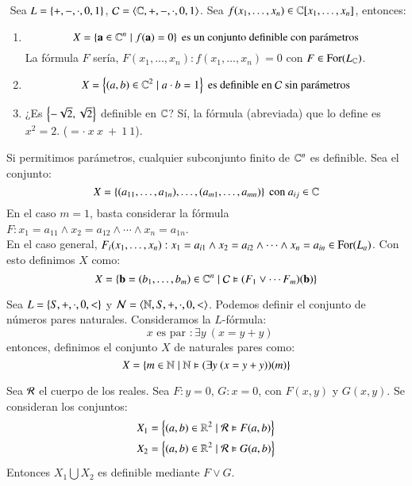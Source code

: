 \begin{eg}$ $
    Sea $L = \left\{+, -, \cdot, 0, 1\right\}$, $\mathcal{C} = \langle\mathbb{C}, +, -, \cdot, 0, 1\rangle$. Sea $f(x_1, \ldots, x_n) \in \mathbb{C}[x_1, \ldots, x_n]$, entonces:
    \begin{enumerate}
        \item
        $$
            X = \left\{\mathbf{a} \in \mathbb{C}^n \mid f(\mathbf{a}) = 0\right\} \text{ es un conjunto definible con parámetros}
        $$
        La fórmula $F$ sería, $F(x_1, \ldots, x_n): f(x_1, \ldots, x_n) = 0$ con $F \in \mathrm{For}(L_{\mathbb{C}})$.

        \item $$X = \left\{(a, b) \in \mathbb{C}^2 \mid a\cdot b = 1\right\} \text{ es definible en $\mathcal{C}$ sin parámetros}$$

        \item ¿Es $\left\{-\sqrt 2, \sqrt 2\right\}$ definible en $\mathcal{\mathbb{C}}$? Sí, la fórmula (abreviada) que lo define es $x^2 = 2$. ($ = \cdot\ x\ x\ +\ 1\ 1$).
    \end{enumerate}
\end{eg}

\begin{obs}
    Si permitimos parámetros, cualquier subconjunto finito de $\mathbb{C}^n$ es definible. Sea el conjunto:
    $$
        X = \left\{(a_{11}, \ldots, a_{1n}), \ldots, (a_{m1}, \ldots, a_{mn})\right\} \text{ con } a_{ij} \in \mathbb{C}
    $$
    En el caso $m = 1$, basta considerar la fórmula $F: x_1 = a_{11} \land x_2 = a_{12} \land \cdots \land x_n = a_{1n}$.\\
    En el caso general, $F_i(x_1, \ldots, x_n): x_1 = a_{i1} \land x_2 = a_{i2} \land \cdots \land x_n = a_{in} \in \mathrm{For}(L_a)$. Con esto definimos $X$ como:
    $$
        X = \left\{\mathbf{b} = (b_1, \ldots, b_m) \in \mathbb{C}^n \mid \mathcal{C} \vDash (F_1 \lor \cdots F_m)(\mathbf{b})\right\}
    $$
\end{obs}

\begin{eg}
    Sea $L = \left\{S, +, \cdot, 0, <\right\}$ y $\mathcal{N} = \langle\mathbb{N}, S, +, \cdot, 0, <\rangle$. Podemos definir el conjunto de números pares naturales. Consideramos la $L$-fórmula:
    $$
        \text{ $x$ es par }: \exists y\ (x = y + y)
    $$
    entonces, definimos el conjunto $X$ de naturales pares como:
    $$
        X = \left\{ m \in \mathbb{N} \mid \mathbb{N} \vDash (\exists y\ (x = y + y))(m)\right\}
    $$
\end{eg}

\begin{obs}
    Sea $\mathcal{R}$ el cuerpo de los reales. Sea $F: y = 0$, $G: x = 0$, con $F(x, y)$ y $G(x, y)$. Se consideran los conjuntos:
    \begin{align*}
        X_1 &= \left\{(a, b) \in \mathbb{R}^2 \mid \mathcal{R} \vDash F(a, b)\right\}\\
        X_2 &= \left\{(a, b) \in \mathbb{R}^2 \mid \mathcal{R} \vDash G(a, b)\right\}
    \end{align*}
    Entonces $X_1 \bigcup X_2$ es definible mediante $F \lor G$.
\end{obs}

